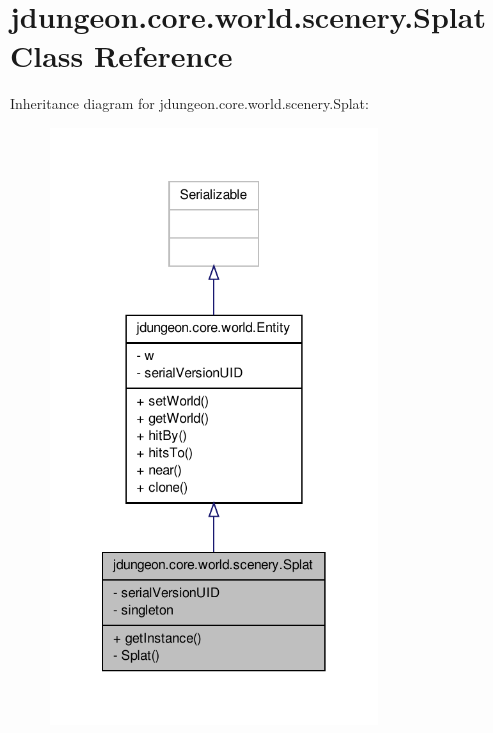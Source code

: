 \hypertarget{classjdungeon_1_1core_1_1world_1_1scenery_1_1_splat}{
\section{jdungeon.core.world.scenery.Splat Class Reference}
\label{classjdungeon_1_1core_1_1world_1_1scenery_1_1_splat}
}


Inheritance diagram for jdungeon.core.world.scenery.Splat:
\nopagebreak
\begin{figure}[H]
\begin{center}
\leavevmode
\includegraphics[width=246pt]{classjdungeon_1_1core_1_1world_1_1scenery_1_1_splat__inherit__graph}
\end{center}
\end{figure}



